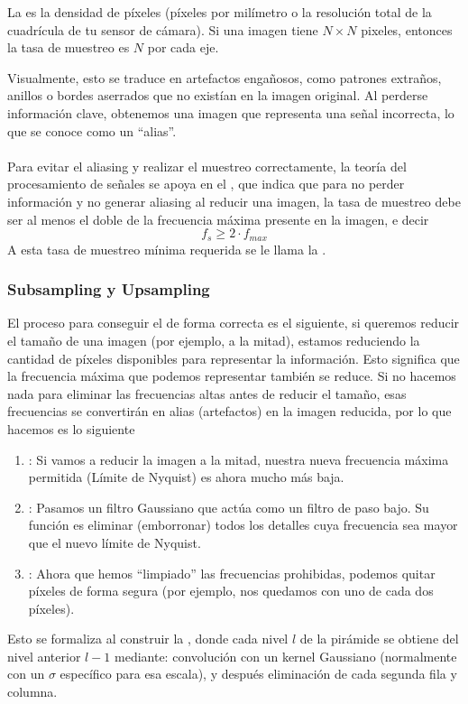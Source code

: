 \begin{definicion}
    La  es la densidad de píxeles (píxeles por milímetro o la resolución total de la cuadrícula de tu sensor de cámara). Si una imagen tiene $N \times N$ pixeles, entonces la tasa de muestreo es $N$ por cada eje.
\end{definicion}
\noindent
Visualmente, esto se traduce en artefactos engañosos, como patrones extraños, anillos o bordes aserrados que no existían en la imagen original. Al perderse información clave, obtenemos una imagen que representa una señal incorrecta, lo que se conoce como un ``alias''.  \\\\
\noindent
Para evitar el aliasing y realizar el muestreo correctamente, la teoría del procesamiento de señales se apoya en el , que indica que para no perder información y no generar aliasing al reducir una imagen, la tasa de muestreo debe ser al menos el doble de la frecuencia máxima presente en la imagen, e decir
\begin{equation*}
    f_s \geq 2 \cdot f_{max}
\end{equation*}
A esta tasa de muestreo mínima requerida se le llama la .

\subsubsection{Subsampling y Upsampling}

\noindent
El proceso para conseguir el  de forma correcta es el siguiente, si queremos reducir el tamaño de una imagen (por ejemplo, a la mitad), estamos reduciendo la cantidad de píxeles disponibles para representar la información. Esto significa que la frecuencia máxima que podemos representar también se reduce. Si no hacemos nada para eliminar las frecuencias altas antes de reducir el tamaño, esas frecuencias se convertirán en alias (artefactos) en la imagen reducida, por lo que hacemos es lo siguiente
\begin{enumerate}
    \item {}: Si vamos a reducir la imagen a la mitad, nuestra nueva frecuencia máxima permitida (Límite de Nyquist) es ahora mucho más baja.
    \item {}: Pasamos un filtro Gaussiano que actúa como un filtro de paso bajo. Su función es eliminar (emborronar) todos los detalles cuya frecuencia sea mayor que el nuevo límite de Nyquist.
    \item {}: Ahora que hemos ``limpiado'' las frecuencias prohibidas, podemos quitar píxeles de forma segura (por ejemplo, nos quedamos con uno de cada dos píxeles).
\end{enumerate}
Esto se formaliza al construir la , donde cada nivel $l$ de la pirámide se obtiene del nivel anterior $l-1$ mediante: convolución con un kernel Gaussiano (normalmente con un $\sigma$ específico para esa escala), y después eliminación de cada segunda fila y columna.


